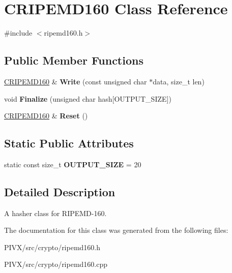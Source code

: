 \hypertarget{class_c_r_i_p_e_m_d160}{}\section{C\+R\+I\+P\+E\+M\+D160 Class Reference}
\label{class_c_r_i_p_e_m_d160}


{\ttfamily \#include $<$ripemd160.\+h$>$}

\subsection*{Public Member Functions}
\begin{DoxyCompactItemize}
\item 
\mbox{\label{class_c_r_i_p_e_m_d160_a221143b9d94af623d07c4f4ba1bf6007}} 
\mbox{\hyperlink{class_c_r_i_p_e_m_d160}{C\+R\+I\+P\+E\+M\+D160}} \& {\bfseries Write} (const unsigned char $\ast$data, size\+\_\+t len)
\item 
\mbox{\label{class_c_r_i_p_e_m_d160_a2a11566fbf9d1339b819833313fc4e51}} 
void {\bfseries Finalize} (unsigned char hash\mbox{[}O\+U\+T\+P\+U\+T\+\_\+\+S\+I\+ZE\mbox{]})
\item 
\mbox{\label{class_c_r_i_p_e_m_d160_ac096d8ee1b21500f1b6173c44896107b}} 
\mbox{\hyperlink{class_c_r_i_p_e_m_d160}{C\+R\+I\+P\+E\+M\+D160}} \& {\bfseries Reset} ()
\end{DoxyCompactItemize}
\subsection*{Static Public Attributes}
\begin{DoxyCompactItemize}
\item 
\mbox{\label{class_c_r_i_p_e_m_d160_aa43ca990046f81de5473975e5ef71922}} 
static const size\+\_\+t {\bfseries O\+U\+T\+P\+U\+T\+\_\+\+S\+I\+ZE} = 20
\end{DoxyCompactItemize}


\subsection{Detailed Description}
A hasher class for R\+I\+P\+E\+M\+D-\/160. 

The documentation for this class was generated from the following files\+:\begin{DoxyCompactItemize}
\item 
P\+I\+V\+X/src/crypto/ripemd160.\+h\item 
P\+I\+V\+X/src/crypto/ripemd160.\+cpp\end{DoxyCompactItemize}
